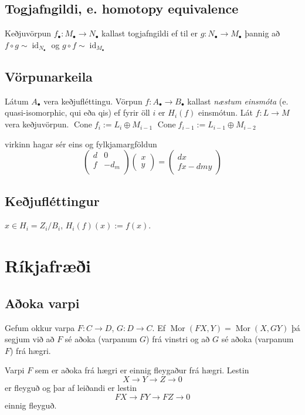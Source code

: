 \documentclass[a4paper, 14pt]{article}
\DeclareMathOperator{\Mor}{Mor}
\DeclareMathOperator{\id}{id}
\DeclareMathOperator{\Cone}{Cone}
\begin{document}
\subsection{Togjafngildi, e. homotopy equivalence}
Keðjuvörpun $f_\bullet: M_\bullet \to N_\bullet$ kallast togjafngildi ef til er $g: N_\bullet \to M_\bullet $ þannig að
$f \circ g \sim \id_{N_\bullet}$ og $g \circ f \sim \id_{M_\bullet}$ 


\subsection{Vörpunarkeila}
Látum $A_\bullet$ vera keðjufléttingu. Vörpun $f: A_\bullet \to B_\bullet$ kallast \emph{næstum einsmóta}
(e. quasi-isomorphic, qui eða qis) ef fyrir öll $i$ er $H_i(f)$ einsmótun.
Lát $f: L \to M$ vera keðjuvörpun. $\Cone f_i := L_i \oplus M_{i-1}$
$\Cone f_{i-1} := L_{i-1} \oplus M_{i-2}$

virkinn hagar sér eins og fylkjamargföldun
\[
    \begin{pmatrix}
    d & 0 \\
    f & -d_m \\
    \end{pmatrix}
    \begin{pmatrix}
    x \\ y 
    \end{pmatrix}
    =
    \begin{pmatrix}
    dx \\ fx - dmy
    \end{pmatrix}
\]

\subsection{Keðjufléttingur}
$x \in H_i = Z_i/B_i$,
$H_i(f)(x) := f(x)$.

\section{Ríkjafræði}

\subsection{Aðoka varpi}
Gefum okkur varpa $F: C \rightarrow D$, $G: D \rightarrow C$.
Ef $\Mor(FX, Y) = \Mor(X, GY)$ þá segjum við að $F$ sé aðoka (varpanum $G$)
frá vinstri og að $G$ sé aðoka (varpanum $F$) frá hægri.

Varpi $F$ sem er aðoka frá hægri er einnig fleygaður frá hægri. 
Lestin
$$
    X \rightarrow Y \rightarrow Z \rightarrow 0
$$
er fleyguð og þar af leiðandi er lestin
$$
    FX \to FY \to FZ \to 0
$$
einnig fleyguð.
\end{document}
